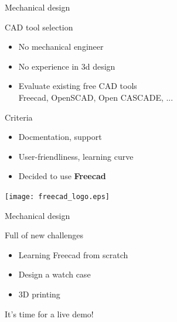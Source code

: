 \documentclass[compress,red]{beamer}
\begin{document}
\begin{frame}{Mechanical design}

  CAD tool selection

  \begin{itemize}
  \item No mechanical engineer
  \item No experience in 3d design
  \item Evaluate existing free CAD tools \\
    Freecad, OpenSCAD, Open CASCADE, ...
  \end{itemize}

  \pause
  Criteria

  \begin{itemize}
  \item Docmentation, support
  \item User-friendliness, learning curve
  \end{itemize}

  \pause
  \begin{itemize}
  \item Decided to use \textbf{Freecad}
  \end{itemize}

  \begin{center}
    \texttt{[image: freecad\_logo.eps]}
  \end{center}

  \note{}

\end{frame}

\begin{frame}{Mechanical design}

  Full of new challenges

  \begin{itemize}
  \item Learning Freecad from scratch
  \item Design a watch case
  \item 3D printing
  \end{itemize}

  \pause
  \vskip 6mm
  It's time for a live demo!


\end{frame}
\end{document}
